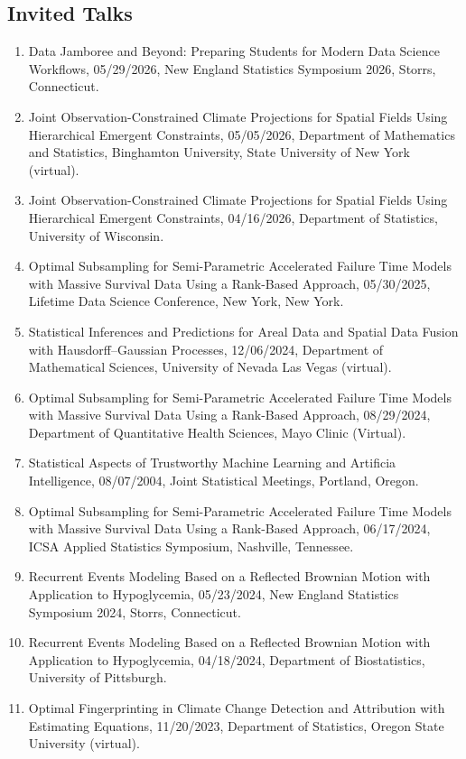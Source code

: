 \documentclass[Statistics]{vita}
\begin{document}
\begin{vita}
  \subsection{Invited Talks}
  \begin{enumerate}
  \item Data Jamboree and Beyond: Preparing Students for Modern Data Science Workflows, 05/29/2026, New England Statistics Symposium 2026, Storrs, Connecticut.
  \item Joint Observation-Constrained Climate Projections for Spatial Fields Using Hierarchical Emergent Constraints, 05/05/2026, Department of Mathematics and Statistics, Binghamton University, State University of New York (virtual).
  \item Joint Observation-Constrained Climate Projections for Spatial Fields Using Hierarchical Emergent Constraints, 04/16/2026, Department of Statistics, University of Wisconsin.
  \item Optimal Subsampling for Semi-Parametric Accelerated Failure Time Models with Massive Survival Data Using a Rank-Based Approach, 05/30/2025, Lifetime Data Science Conference, New York, New York.
  \item Statistical Inferences and Predictions for Areal Data and Spatial Data Fusion with Hausdorff--Gaussian Processes, 12/06/2024, Department of Mathematical Sciences, University of Nevada Las Vegas (virtual).
  \item Optimal Subsampling for Semi-Parametric Accelerated Failure Time Models with Massive Survival Data Using a Rank-Based Approach, 08/29/2024, Department of Quantitative Health Sciences, Mayo Clinic (Virtual).
  \item Statistical Aspects of Trustworthy Machine Learning and Artificia Intelligence, 08/07/2004, Joint Statistical Meetings, Portland, Oregon.
  \item Optimal Subsampling for Semi-Parametric Accelerated Failure Time Models with Massive Survival Data Using a Rank-Based Approach, 06/17/2024, ICSA Applied Statistics Symposium, Nashville, Tennessee.
  \item Recurrent Events Modeling Based on a Reflected Brownian Motion with Application to Hypoglycemia, 05/23/2024, New England Statistics Symposium 2024, Storrs, Connecticut.
  \item Recurrent Events Modeling Based on a Reflected Brownian Motion with Application to Hypoglycemia, 04/18/2024, Department of Biostatistics, University of Pittsburgh.
  \item Optimal Fingerprinting in Climate Change Detection and Attribution with Estimating Equations, 11/20/2023, Department of Statistics, Oregon State University (virtual).

\end{enumerate}
\end{vita}
\end{document}
